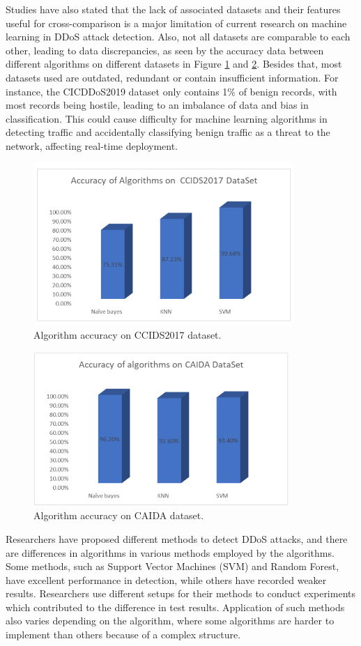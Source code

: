 \documentclass[a4paper, 12pt]{article}
\begin{document}
Studies have also stated that the lack of associated datasets and their features useful for cross-comparison is a major limitation of current research on machine learning in DDoS attack detection.  Also, not all datasets are comparable to each other, leading to data discrepancies, as seen by the accuracy data between different algorithms on different datasets in Figure \ref{fig:1} and \ref{fig:2}. Besides that, most datasets used are outdated, redundant or contain insufficient information. For instance, the CICDDoS2019 dataset only contains 1\% of benign records, with most records being hostile, leading to an imbalance of data and bias in classification.  This could cause difficulty for machine learning algorithms in detecting traffic and accidentally classifying benign traffic as a threat to the network, affecting real-time deployment.

\begin{figure}[ht]
    \centering
    \includegraphics[width=0.5\linewidth]{CCIDS.png}
    \caption{Algorithm accuracy on CCIDS2017 dataset. \protect{}}
    \label{fig:1}
\end{figure}

\begin{figure}[ht]
    \centering
    \includegraphics[width=0.5\linewidth]{CAIDA.png}
    \caption{Algorithm accuracy on CAIDA dataset. \protect{}}
    \label{fig:2}
\end{figure}

Researchers have proposed different methods to detect DDoS attacks, and there are differences in algorithms in various methods employed by the algorithms. Some methods, such as Support Vector Machines (SVM) and Random Forest, have excellent performance in detection, while others have recorded weaker results. Researchers use different setups for their methods to conduct experiments which contributed to the difference in test results.  Application of such methods also varies depending on the algorithm, where some algorithms are harder to implement than others because of a complex structure. \cite{9} 
\end{document}
